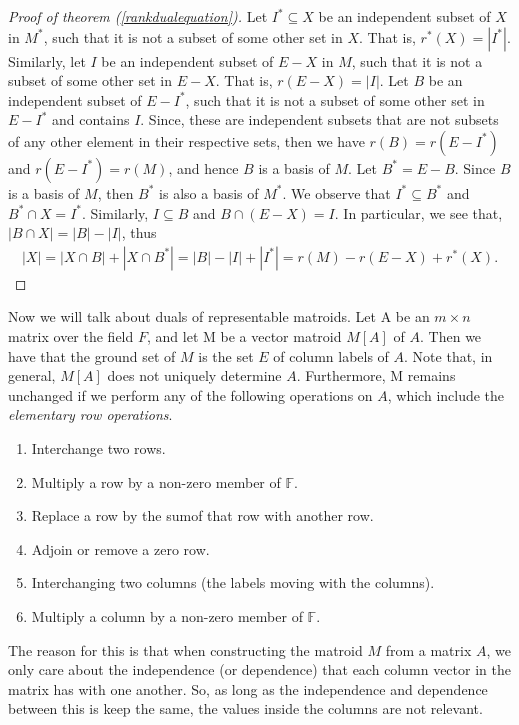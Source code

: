 \begin{proof}[Proof of theorem (\ref{rankdualequation})]
    Let $I^* \subseteq X$ be an independent subset of $X$ in $M^*$, such that it is not a subset of some other set in $X$. That is, $r^*(X)=|I^*|$. Similarly, let $I$ be an independent subset of $E-X$ in $M$, such that it is not a subset of some other set in $E-X$. That is, $r(E-X)=|I|$. Let $B$ be an independent subset of $E-I^*$, such that it is not a subset of some other set in $E-I^*$ and contains $I$. Since, these are independent subsets that are not subsets of any other element in their respective sets, then we have $r(B)=r(E-I^*)$ and $r(E-I^*)=r(M)$, and hence $B$ is a basis of $M$.
    Let $B^*=E-B$. Since $B$ is a basis of $M$, then $B ^* $ is also a basis of $M^*$. We observe that $I^*\subseteq B^*$ and  $B^*\cap X=I^*$. Similarly, $I\subseteq B$ and  $B\cap (E-X)=I$. In particular, we see that, $|B\cap X|=|B|-|I|$, thus
    \begin{align*}
    |X|=|X\cap B|+|X\cap B^*|=|B|-|I|+|I^*|=r(M)-r(E-X)+r^*(X).
    \end{align*}
\end{proof}


Now we will talk about duals of representable matroids.
Let A be an $m \times n$ matrix over the field $F$, and let M be a vector matroid $M[A]$ of $A$. Then we have that the ground set of $M$ is the set $E$ of column labels of $A$. Note that, in general, $M[A]$ does not uniquely determine $A$. Furthermore, M remains unchanged if we perform any of the following operations on $A$, which include the \textit{elementary row operations}.
\begin{enumerate}
    \item Interchange two rows.
    \item Multiply a row by a non-zero member of $\mathbb{F}$.
    \item Replace a row by the sumof that row with another row.
    \item Adjoin or remove a zero row.
    \item Interchanging two columns (the labels moving with the columns).
    \item Multiply a column by a non-zero member of $\mathbb{F}$.
\end{enumerate}

The reason for this is that when constructing the matroid $M$ from a matrix $A$, we only care about the independence (or dependence) that each column vector in the matrix has with one another. So, as long as the independence and dependence between this is keep the same, the values inside the columns are not relevant.

